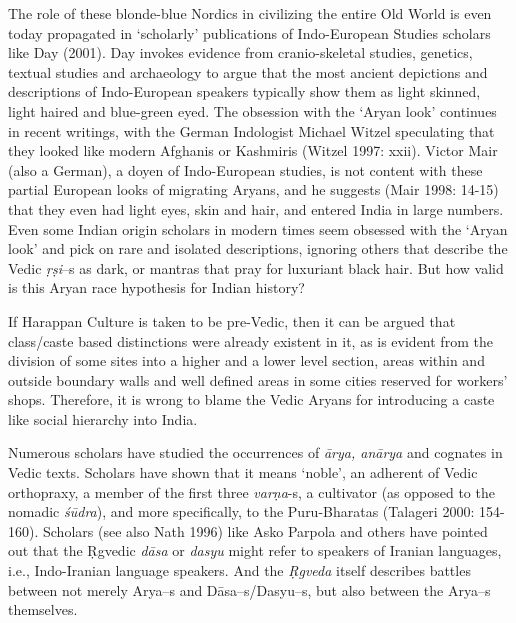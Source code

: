 The role of these blonde-blue Nordics in civilizing the entire Old World is even today propagated in ‘scholarly’ publications of Indo-European Studies scholars like Day (2001). Day invokes evidence from cranio-skeletal studies, genetics, textual studies and archaeology to argue that the most ancient depictions and descriptions of Indo-European speakers typically show them as light skinned, light haired and blue-green eyed. The obsession with the ‘Aryan look’ continues in recent writings, with the German Indologist Michael Witzel speculating that they looked like modern Afghanis or Kashmiris (Witzel 1997: xxii). Victor Mair (also a German), a doyen of Indo-European studies, is not content with these partial European looks of migrating Aryans, and he suggests (Mair 1998: 14-15) that they even had light eyes, skin and hair, and entered India in large numbers. Even some Indian origin scholars in modern times seem obsessed with the ‘Aryan look’ and pick on rare and isolated descriptions, ignoring others that describe the Vedic \textit{ṛṣi}--s as dark, or mantras that pray for luxuriant black hair. But how valid is this Aryan race hypothesis for Indian history?

If Harappan Culture is taken to be pre-Vedic, then it can be argued that class/caste based distinctions were already existent in it, as is evident from the division of some sites into a higher and a lower level section, areas within and outside boundary walls and well defined areas in some cities reserved for workers’ shops. Therefore, it is wrong to blame the Vedic Aryans for introducing a caste like social hierarchy into India.

Numerous scholars have studied the occurrences of \textit{ārya, anārya} and cognates in Vedic texts. Scholars have shown that it means ‘noble’, an adherent of Vedic orthopraxy, a member of the first three \textit{varṇa}-s, a cultivator (as opposed to the nomadic \textit{śūdra}), and more specifically, to the Puru-Bharatas (Talageri 2000: 154-160). Scholars (see also Nath 1996) like Asko Parpola and others have pointed out that the Ṛgvedic \textit{dāsa} or \textit{dasyu} might refer to speakers of Iranian languages, i.e., Indo-Iranian language speakers. And the \textit{Ṛgveda} itself describes battles between not merely Arya--s and Dāsa--s/Dasyu--s, but also between the Arya--s themselves.


